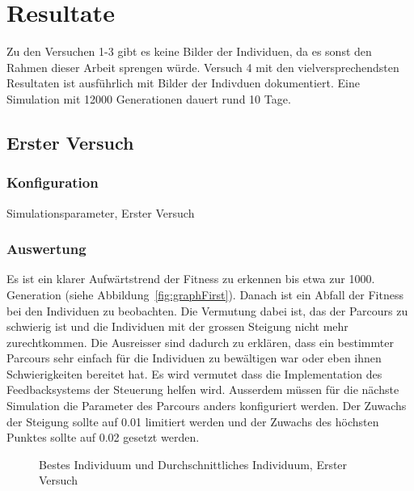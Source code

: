 %
%

\chapter{Resultate\label{chap:Resultate}}

Zu den Versuchen 1-3 gibt es keine Bilder der Individuen, da es sonst den Rahmen dieser Arbeit sprengen würde.
Versuch 4 mit den vielversprechendsten Resultaten ist ausführlich mit Bilder der Indivduen dokumentiert.
Eine Simulation mit 12000 Generationen dauert rund 10 Tage.

\section{Erster Versuch}

  \subsection{Konfiguration}

    \begin{table}[H]
      \centering
      
      \caption{Simulationsparameter, Erster Versuch}
    \end{table}

  \subsection{Auswertung}

    Es ist ein klarer Aufwärtstrend der Fitness zu erkennen bis etwa zur 1000. Generation (siehe Abbildung~\vref{fig:graphFirst}).
    Danach ist ein Abfall der Fitness bei den Individuen zu beobachten.
    Die Vermutung dabei ist, das der Parcours zu schwierig ist und die Individuen
    mit der grossen Steigung nicht mehr zurechtkommen.
    Die Ausreisser sind dadurch zu erklären,
    dass ein bestimmter Parcours sehr einfach für die Individuen zu bewältigen war oder eben ihnen Schwierigkeiten bereitet hat.
    Es wird vermutet dass die Implementation des Feedbacksystems der Steuerung helfen wird.
    Ausserdem müssen für die nächste Simulation die Parameter des Parcours anders konfiguriert werden.
    Der Zuwachs der Steigung sollte auf 0.01 limitiert werden und der Zuwachs des höchsten Punktes
    sollte auf 0.02 gesetzt werden.

    \begin{figure}
      \centering
      
      \caption{Bestes Individuum und Durchschnittliches Individuum, Erster Versuch\label{fig:graphFirst}}
    \end{figure}

